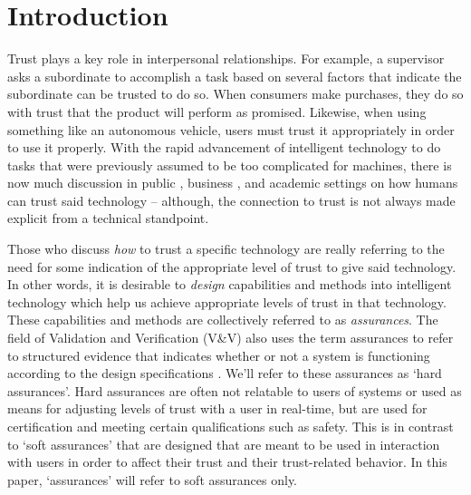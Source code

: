 \section{Introduction}\label{sec:introduction}
Trust plays a key role in interpersonal relationships. For example, a supervisor asks a subordinate to accomplish a task based on several factors that indicate the subordinate can be trusted to do so. When consumers make purchases, they do so with trust that the product will perform as promised. Likewise, when using something like an autonomous vehicle, users must trust it appropriately in order to use it properly. With the rapid advancement of intelligent technology to do tasks that were previously assumed to be too complicated for machines, there is now much discussion in public \cite{Spectrum2016-jv,DeSteno2014-cq,Wagner2016-ck}, business \cite{Banavar2016-nm, Khosravi2016-ke,Tankard2016-rk}, and academic settings \cite{Foley2017-qj,Castelvecchi2016-mr} on how humans can trust said technology -- although, the connection to trust is not always made explicit from a technical standpoint. 

Those who discuss \emph{how} to trust a specific technology are really referring to the need for some indication of the appropriate level of trust to give said technology. In other words, it is desirable to \emph{design} capabilities and methods into intelligent technology which help us achieve appropriate levels of trust in that technology. These capabilities and methods are collectively referred to as \textit{assurances}. The field of Validation and Verification (V\&V) also uses the term assurances to refer to structured evidence that indicates whether or not a system is functioning according to the design specifications \cite{Calinescu2017-fh}. We'll refer to these assurances as `hard assurances'. Hard assurances are often not relatable to users of systems or used as means for adjusting levels of trust with a user in real-time, but are used for certification and meeting certain qualifications such as safety. This is in contrast to `soft assurances' that are designed that are meant to be used in interaction with users in order to affect their trust and their trust-related behavior. In this paper, `assurances' will refer to soft assurances only.
    
